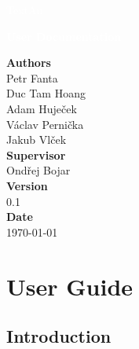 \documentclass[12pt,a4paper]{report}
\begin{document}
\begin{titlepage}
\BgThispage

\vspace*{0.3\textheight}
\noindent
\textcolor{white}{\bigsf TextAn}

\vspace*{1cm}
\noindent
\textcolor{white}{\Huge\textbf{\textsf{User Documentation}}}

\vspace*{2cm}\par
\noindent
\begin{minipage}{0.35\linewidth}
\textbf{Authors} \\
Petr Fanta \\
Duc Tam Hoang \\
Adam Huječek \\
Václav Pernička \\
Jakub Vlček\vspace{40pt} \\
\textbf{Supervisor} \\
Ondřej Bojar\vspace{40pt} \\
\textbf{Version} \\
0.1\vspace{40pt} \\
\textbf{Date} \\
\today \\
\end{minipage}


\end{titlepage}
\restoregeometry

\tableofcontents



\chapter{User Guide}

\section{Introduction}
\end{document}
